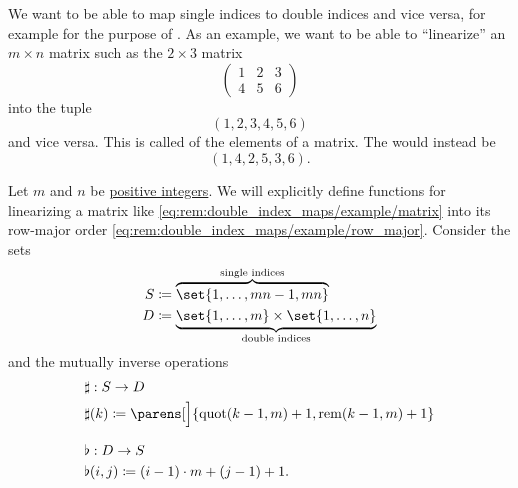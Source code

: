 \begin{remark}\label{rem:double_index_maps}
  We want to be able to map single indices to double indices and vice versa, for example for the purpose of . As an example, we want to be able to \enquote{linearize} an \( m \times n \) matrix such as the \( 2 \times 3 \) matrix
  \begin{equation}\label{eq:rem:double_index_maps/example/matrix}
    \begin{pmatrix}
      1 & 2 & 3 \\
      4 & 5 & 6
    \end{pmatrix}
  \end{equation}
  into the tuple
  \begin{equation}\label{eq:rem:double_index_maps/example/row_major}
    (1, 2, 3, 4, 5, 6)
  \end{equation}
  and vice versa. This is called  of the elements of a matrix. The  would instead be
  \begin{equation}\label{eq:rem:double_index_maps/example/column_major}
    (1, 4, 2, 5, 3, 6).
  \end{equation}

  Let \( m \) and \( n \) be \hyperref[def:integer_signum]{positive integers}. We will explicitly define functions for linearizing a matrix like \eqref{eq:rem:double_index_maps/example/matrix} into its row-major order \eqref{eq:rem:double_index_maps/example/row_major}. Consider the sets
  \begin{align*}
    S &\coloneqq \overbrace{ \set{ 1, \ldots, mn - 1, mn } }^{\T{single indices}}
    \\
    D &\coloneqq \underbrace{ \set{ 1, \ldots, m } \times \set{ 1, \ldots, n } }_{\T{double indices}}
  \end{align*}
  and the mutually inverse operations
  \begin{align}
    &\begin{aligned}\label{eq:rem:double_index_maps/sharp}
      &\sharp: S \to D \\
      &\sharp(k) \coloneqq \parens[\Big]{ \quot(k - 1, m) + 1, \rem(k - 1, m) + 1 } \\
    \end{aligned}
    \\[0.5\baselineskip]
    &\begin{aligned}\label{eq:rem:double_index_maps/flat}
      &\flat: D \to S \\
      &\flat(i, j) \coloneqq (i - 1) \cdot m + (j - 1) + 1.
    \end{aligned}
  \end{align}


\end{remark}
